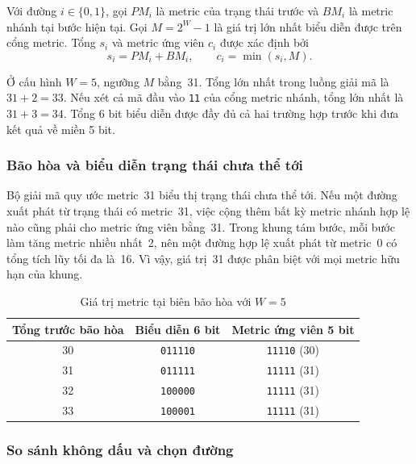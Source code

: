 \documentclass[12pt,a4paper]{article}
\renewcommand{\_}{\originalunderscore\allowbreak}
\begin{document}
Với đường $i\in\{0,1\}$, gọi $PM_i$ là metric của trạng thái trước
và $BM_i$ là metric nhánh tại bước hiện tại. Gọi $M=2^W-1$ là giá trị
lớn nhất biểu diễn được trên cổng metric. Tổng $s_i$ và metric
ứng viên $c_i$ được xác định bởi
\begin{equation}
    s_i=PM_i+BM_i,
    \qquad
    c_i=\min(s_i,M).
\end{equation}

Ở cấu hình $W=5$, ngưỡng $M$ bằng~31. Tổng lớn nhất trong luồng
giải mã là $31+2=33$. Nếu xét cả mã đầu vào \texttt{11} của cổng
metric nhánh, tổng lớn nhất là $31+3=34$. Tổng 6 bit biểu diễn được
đầy đủ cả hai trường hợp trước khi đưa kết quả về miền 5 bit.

\subsubsection{Bão hòa và biểu diễn trạng thái chưa thể tới}

Bộ giải mã quy ước metric~31 biểu thị trạng thái chưa thể tới.
Nếu một đường xuất phát từ trạng thái có metric~31, việc cộng thêm
bất kỳ metric nhánh hợp lệ nào cũng phải cho metric ứng viên bằng~31.
Trong khung tám bước, mỗi bước làm tăng metric nhiều nhất~2, nên
một đường hợp lệ xuất phát từ metric~0 có tổng tích lũy tối đa
là~16. Vì vậy, giá trị~31 được phân biệt với mọi metric hữu hạn
của khung.

\begin{table}[H]
    \centering
    \small
    \begin{tabular}{@{}c c c@{}}
        \toprule
        \textbf{Tổng trước bão hòa} & \textbf{Biểu diễn 6 bit}
        & \textbf{Metric ứng viên 5 bit} \\
        \midrule
        30 & \texttt{011110} & \texttt{11110} (30) \\
        31 & \texttt{011111} & \texttt{11111} (31) \\
        32 & \texttt{100000} & \texttt{11111} (31) \\
        33 & \texttt{100001} & \texttt{11111} (31) \\
        \bottomrule
    \end{tabular}
    \caption{Giá trị metric tại biên bão hòa với $W=5$}
\end{table}

\subsubsection{So sánh không dấu và chọn đường}
\end{document}
